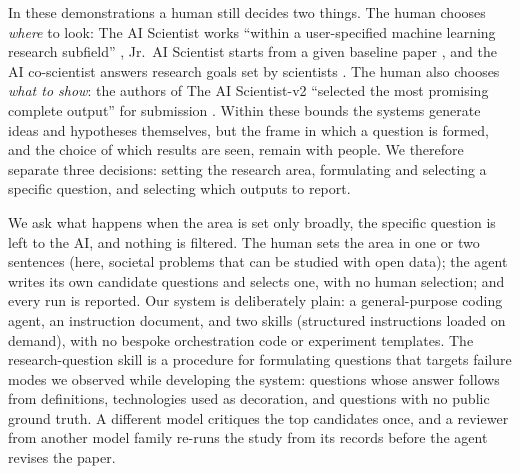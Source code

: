 \documentclass[11pt]{article}
\begin{document}
In these demonstrations a human still decides two things. The human chooses \emph{where} to look: The AI Scientist works ``within a user-specified machine learning research subfield'' \citep{lu2026nature}, Jr.\ AI Scientist starts from a given baseline paper \citep{miyai2025jraiscientist}, and the AI co-scientist answers research goals set by scientists \citep{gottweis2025coscientist}. The human also chooses \emph{what to show}: the authors of The AI Scientist-v2 ``selected the most promising complete output'' for submission \citep{yamada2025aiscientistv2}. Within these bounds the systems generate ideas and hypotheses themselves, but the frame in which a question is formed, and the choice of which results are seen, remain with people. We therefore separate three decisions: setting the research area, formulating and selecting a specific question, and selecting which outputs to report.

We ask what happens when the area is set only broadly, the specific question is left to the AI, and nothing is filtered. The human sets the area in one or two sentences (here, societal problems that can be studied with open data); the agent writes its own candidate questions and selects one, with no human selection; and every run is reported. Our system is deliberately plain: a general-purpose coding agent, an instruction document, and two skills (structured instructions loaded on demand), with no bespoke orchestration code or experiment templates. The research-question skill is a procedure for formulating questions that targets failure modes we observed while developing the system: questions whose answer follows from definitions, technologies used as decoration, and questions with no public ground truth. A different model critiques the top candidates once, and a reviewer from another model family re-runs the study from its records before the agent revises the paper.
\end{document}
